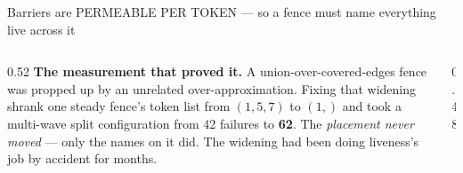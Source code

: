 \documentclass[aspectratio=169,9pt]{beamer}
\newcommand{\tsub}[1]{{\footnotesize\color{gray}#1}}
\newcommand{\key}[1]{\textcolor{acc}{\textbf{#1}}}
\newcommand{\bad}[1]{\textcolor{warn}{\textbf{#1}}}
\newcommand{\good}[1]{\textcolor{ok}{\textbf{#1}}}
\begin{document}
\begin{frame}{Barriers are PERMEABLE PER TOKEN --- so a fence must name everything live across it}
\begin{columns}[T]
\begin{column}{0.52\textwidth}
\bad{The measurement that proved it.} A union-over-covered-edges fence was propped up by an unrelated
over-approximation. Fixing that widening shrank one steady fence's token list from $(1,5,7)$ to $(1,)$ and took a
multi-wave split configuration from 42 failures to \textbf{62}. The \emph{placement never moved} --- only the names
on it did. The widening had been doing liveness's job by accident for months.
\end{column}
\begin{column}{0.48\textwidth}
\begin{center}
\end{center}
\end{column}
\end{columns}
\end{frame}
\end{document}

